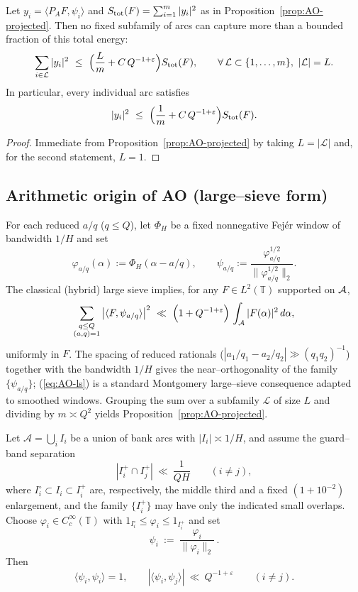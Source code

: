 \begin{corollary}\label{cor:no-hotspots}
Let $y_i=\langle P_A F,\psi_i\rangle$ and $S_{\rm tot}(F)=\sum_{i=1}^m |y_i|^2$ as in Proposition~\ref{prop:AO-projected}. 
Then no fixed subfamily of arcs can capture more than a bounded fraction of this total energy:
\[
\sum_{i\in\mathcal L}|y_i|^2
\ \le\ \Bigl(\frac{L}{m}+C\,Q^{-1+\varepsilon}\Bigr)S_{\rm tot}(F),
\qquad\forall\,\mathcal L\subset\{1,\dots,m\},\ |\mathcal L|=L.
\]
In particular, every individual arc satisfies
\[
|y_i|^2\ \le\ \Bigl(\frac{1}{m}+C\,Q^{-1+\varepsilon}\Bigr)S_{\rm tot}(F).
\]
\end{corollary}

\begin{proof}
Immediate from Proposition~\ref{prop:AO-projected} by taking $L=|\mathcal L|$ and, for the second statement, $L=1$.
\end{proof}

\subsection{Arithmetic origin of AO (large–sieve form)}\label{subsec:AO-ls}
For each reduced $a/q$ ($q\le Q$), let $\Phi_H$ be a fixed nonnegative Fejér window of bandwidth $1/H$ and set
\[
\varphi_{a/q}(\alpha):=\Phi_H(\alpha-a/q),\qquad 
\psi_{a/q}:=\frac{\varphi_{a/q}^{1/2}}{\|\varphi_{a/q}^{1/2}\|_2}.
\]
The classical (hybrid) large sieve implies, for any $F\in L^2(\mathbb T)$ supported on $\mathcal{A}$,
\begin{equation}\label{eq:AO-ls}
\sum_{\substack{q\le Q\\(a,q)=1}} \big|\langle F,\psi_{a/q}\rangle\big|^2
\ \ll\ \Big(1+Q^{-1+\varepsilon}\Big)\,\int_{\cA}|F(\alpha)|^2\,d\alpha,
\end{equation}
uniformly in $F$. The spacing of reduced rationals ($|a_1/q_1-a_2/q_2|\gg (q_1q_2)^{-1}$) together with the bandwidth $1/H$ gives the near–orthogonality of the family $\{\psi_{a/q}\}$; (\ref{eq:AO-ls}) is a standard Montgomery large–sieve consequence adapted to smoothed windows. Grouping the sum over a subfamily $\mathcal L$ of size $L$ and dividing by $m\asymp Q^2$ yields Proposition~\ref{prop:AO-projected}.

\begin{lemma}\label{lem:AO-near}
Let $\mathcal A=\bigcup_i I_i$ be a union of bank arcs with $|I_i|\asymp 1/H$, and assume the guard–band separation
\[
|I_i^+\cap I_j^+|\ \ll\ \frac{1}{QH}\qquad(i\ne j),
\]
where $I_i^\circ\subset I_i\subset I_i^+$ are, respectively, the middle third and a fixed $(1+10^{-2})$ enlargement, and the family $\{I_i^+\}$ may have only the indicated small overlaps.
Choose $\varphi_i\in C_c^\infty(\mathbb T)$ with $1_{I_i^\circ}\le \varphi_i\le 1_{I_i^+}$ and set
\[
\psi_i\ :=\ \frac{\varphi_i}{\|\varphi_i\|_2}\,.
\]
Then
\[
\langle \psi_i,\psi_i\rangle=1,\qquad 
|\langle \psi_i,\psi_j\rangle|\ \ll\ Q^{-1+\varepsilon}\qquad(i\ne j).
\]
\end{lemma}

